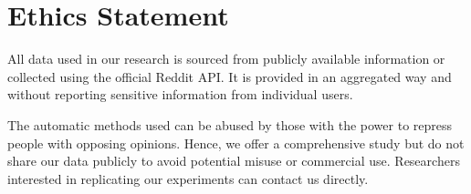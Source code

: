 \section{Ethics Statement}
All data used in our research is sourced from publicly available information or collected using the official Reddit \ac{API}. It is provided in an aggregated way and without reporting sensitive information from individual users.

The automatic methods used can be abused by those with the power to repress people with opposing opinions. Hence, we offer a comprehensive study but do not share our data publicly to avoid potential misuse or commercial use. Researchers interested in replicating our experiments can contact us directly.
